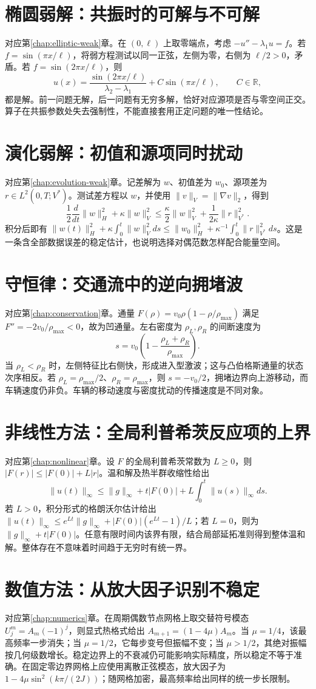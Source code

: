 \section{椭圆弱解：共振时的可解与不可解}
对应第\ref{chap:elliptic-weak}章。在 $(0,\ell)$ 上取零端点，考虑 $-u''-\lambda_1u=f$。若 $f=\sin(\pi x/\ell)$，将弱方程测试以同一正弦，左侧为零，右侧为 $\ell/2>0$，矛盾。若 $f=\sin(2\pi x/\ell)$，则
\[
 u(x)=\frac{\sin(2\pi x/\ell)}{\lambda_2-\lambda_1}
       +C\sin(\pi x/\ell),\qquad C\in\mathbb R,
\]
都是解。前一问题无解，后一问题有无穷多解，恰好对应源项是否与零空间正交。算子在共振参数处失去强制性，不能直接套用正定问题的唯一性结论。

\section{演化弱解：初值和源项同时扰动}
对应第\ref{chap:evolution-weak}章。记差解为 $w$、初值差为 $w_0$、源项差为 $r\in L^2(0,T;V^*)$。测试差方程以 $w$，并使用 $\|v\|_V=\|\nabla v\|_2$，得到
\[
 \frac12\frac d{dt}\|w\|_H^2+\kappa\|w\|_V^2
 \le\frac\kappa2\|w\|_V^2+\frac1{2\kappa}\|r\|_{V^*}^2.
\]
积分后即有 $\|w(t)\|_H^2+\kappa\int_0^t\|w\|_V^2ds\le\|w_0\|_H^2+\kappa^{-1}\int_0^t\|r\|_{V^*}^2ds$。这是一条含全部数据误差的稳定估计，也说明选择对偶范数怎样配合能量空间。

\section{守恒律：交通流中的逆向拥堵波}
对应第\ref{chap:conservation}章。通量 $F(\rho)=v_0\rho(1-\rho/\rho_{\max})$ 满足 $F''=-2v_0/\rho_{\max}<0$，故为凹通量。左右密度为 $\rho_L,\rho_R$ 的间断速度为
\[
 s=v_0\left(1-\frac{\rho_L+\rho_R}{\rho_{\max}}\right).
\]
当 $\rho_L<\rho_R$ 时，左侧特征比右侧快，形成进入型激波；这与凸伯格斯通量的状态次序相反。若 $\rho_L=\rho_{\max}/2$、$\rho_R=\rho_{\max}$，则 $s=-v_0/2$，拥堵边界向上游移动，而车辆速度仍非负。车辆的移动速度与密度扰动的传播速度是不同对象。

\section{非线性方法：全局利普希茨反应项的上界}
对应第\ref{chap:nonlinear}章。设 $F$ 的全局利普希茨常数为 $L\ge0$，则 $|F(r)|\le|F(0)|+L|r|$。温和解及热半群收缩性给出
\[
 \|u(t)\|_\infty\le\|g\|_\infty+t|F(0)|
       +L\int_0^t\|u(s)\|_\infty ds.
\]
若 $L>0$，积分形式的格朗沃尔估计给出 $\|u(t)\|_\infty\le e^{Lt}\|g\|_\infty+|F(0)|(e^{Lt}-1)/L$；若 $L=0$，则为 $\|g\|_\infty+t|F(0)|$。任意有限时间内该界有限，结合局部延拓准则得到整体温和解。整体存在不意味着时间趋于无穷时有统一界。

\section{数值方法：从放大因子识别不稳定}
对应第\ref{chap:numerics}章。在周期偶数节点网格上取交替符号模态 $U_j^m=A_m(-1)^j$，则显式热格式给出 $A_{m+1}=(1-4\mu)A_m$。当 $\mu=1/4$，该最高频率一步消失；当 $\mu=1/2$，它每步变号但振幅不变；当 $\mu>1/2$，其绝对振幅按几何级数增长。稳定边界上的不衰减仍可能影响实际精度，所以稳定不等于准确。在固定零边界网格上应使用离散正弦模态，放大因子为 $1-4\mu\sin^2(k\pi/(2J))$；随网格加密，最高频率给出同样的统一步长限制。

